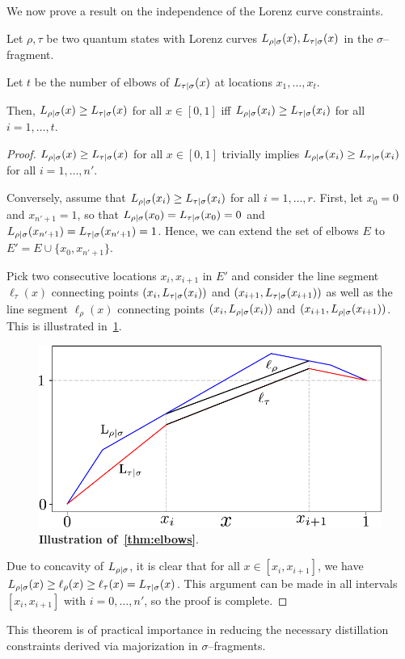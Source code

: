 We now prove a result on the independence of the Lorenz curve constraints.
\begin{proposition}\label{thm:elbows}
	Let $\rho, \tau$ be two quantum states with Lorenz curves ${L_{\rho|\sigma}}(x), {L_{\tau|\sigma}}(x)$ in the $\sigma$--fragment.
	
	Let $t$ be the number of elbows of ${L_{\tau|\sigma}}(x)$ at locations $x_1, \dots, x_t$.
	
	Then, ${L_{\rho|\sigma}}(x) \geq {L_{\tau|\sigma}}(x)$ for all $x \in [0,1]$ iff ${L_{\rho|\sigma}}(x_{i}) \geq {L_{\tau|\sigma}}(x_{i})$ for all $i =1,\dots,t$.
\end{proposition}
\begin{proof}	
	${L_{\rho|\sigma}}(x) \geq {L_{\tau|\sigma}}(x)$ for all $x \in [0,1]$ trivially implies ${L_{\rho|\sigma}}(x_{i}) \geq {L_{\tau|\sigma}}(x_{i})$ for all $i = 1,\dots,n'$.
	
	Conversely, assume that ${L_{\rho|\sigma}}(x_{i}) \geq {L_{\tau|\sigma}}(x_{i})$ for all $i = 1,\dots,r$.
	First, let $x_0 = 0$ and $x_{n'+1} = 1$, so that ${L_{\rho|\sigma}}(x_0) = {L_{\tau|\sigma}}(x_0) = 0$ and ${L_{\rho|\sigma}}(x_{n'+1}) = {L_{\tau|\sigma}}(x_{n'+1}) = 1$.
	Hence, we can extend the set of elbows $E$ to $E' = E \cup \{x_0, x_{n'+1}\}$.
	
	Pick two consecutive locations $x_{i}, x_{i+1}$ in $E'$ and consider the line segment $\ell_\tau(x)$ connecting points $(x_{i}, {L_{\tau|\sigma}}(x_{i}))$ and $(x_{i+1}, {L_{\tau|\sigma}}(x_{i+1}))$ as well as the line segment $\ell_\rho(x)$ connecting points $(x_{i}, {L_{\rho|\sigma}}(x_{i}))$ and $(x_{i+1}, {L_{\rho|\sigma}}(x_{i+1}))$.
	This is illustrated in~\cref{fig:elbows_proof}.
\begin{figure}[h]
    \centering
    \includegraphics[scale=0.6]{figs/elbows_proof.pdf}
    \caption{\textbf{Illustration of~\cref{thm:elbows}}.
    }
    \label{fig:elbows_proof}
\end{figure}

	Due to concavity of ${L_{\rho|\sigma}}$, it is clear that for all $x \in [x_{i}, x_{i+1}]$, we have ${L_{\rho|\sigma}}(x) \geq \ell_\rho(x) \geq \ell_\tau(x) = {L_{\tau|\sigma}}(x)$.
	This argument can be made in all intervals $[x_{i}, x_{i+1}]$ with $i=0,\dots,n'$, so the proof is complete.
\end{proof}
This theorem is of practical importance in reducing the necessary distillation constraints derived via majorization in $\sigma$--fragments.

